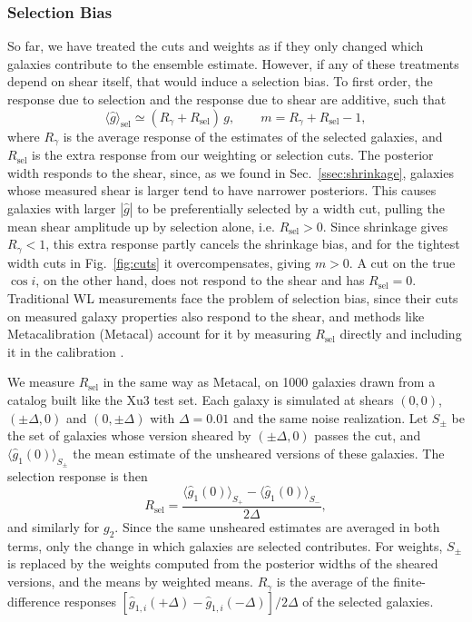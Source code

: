 \subsubsection{Selection Bias}
\label{sssec:selection}

So far, we have treated the cuts and weights as if they only changed which galaxies contribute to the ensemble estimate. However, if any of these treatments depend on shear itself, that would induce a selection bias. To first order, the response due to selection and the response due to shear are additive, such that
\begin{equation}
\label{eqn:selection-response}
    \langle\hat{g}\rangle_\mathrm{sel} \simeq (R_\gamma + R_\mathrm{sel})\, g, \qquad m = R_\gamma + R_\mathrm{sel} - 1,
\end{equation}
where $R_\gamma$ is the average response of the estimates of the selected galaxies, and $R_\mathrm{sel}$ is the extra response from our weighting or selection cuts. The posterior width responds to the shear, since, as we found in Sec.~\ref{ssec:shrinkage}, galaxies whose measured shear is larger tend to have narrower posteriors. This causes galaxies with larger $|\hat{g}|$ to be preferentially selected by a width cut, pulling the mean shear amplitude up by selection alone, i.e. $R_\mathrm{sel} > 0$. Since shrinkage gives $R_\gamma < 1$, this extra response partly cancels the shrinkage bias, and for the tightest width cuts in Fig.~\ref{fig:cuts} it overcompensates, giving $m > 0$. A cut on the true $\cos i$, on the other hand, does not respond to the shear and has $R_\mathrm{sel} = 0$. Traditional WL measurements face the problem of selection bias, since their cuts on measured galaxy properties also respond to the shear, and methods like Metacalibration (Metacal) account for it by measuring $R_\mathrm{sel}$ directly and including it in the calibration \citep{MetacalPractical, Metadet}.

We measure $R_\mathrm{sel}$ in the same way as Metacal, on 1000 galaxies drawn from a catalog built like the Xu3 test set. Each galaxy is simulated at shears $(0,0)$, $(\pm\Delta, 0)$ and $(0, \pm\Delta)$ with $\Delta = 0.01$ and the same noise realization. Let $S_\pm$ be the set of galaxies whose version sheared by $(\pm\Delta, 0)$ passes the cut, and $\langle \hat{g}_1(0) \rangle_{S_\pm}$ the mean estimate of the unsheared versions of these galaxies. The selection response is then
\begin{equation}
\label{eqn:rsel}
    R_\mathrm{sel} = \frac{\langle \hat{g}_1(0) \rangle_{S_+} - \langle \hat{g}_1(0) \rangle_{S_-}}{2\Delta},
\end{equation}
and similarly for $g_2$. Since the same unsheared estimates are averaged in both terms, only the change in which galaxies are selected contributes. For weights, $S_\pm$ is replaced by the weights computed from the posterior widths of the sheared versions, and the means by weighted means. $R_\gamma$ is the average of the finite-difference responses $[\hat{g}_{1,i}(+\Delta) - \hat{g}_{1,i}(-\Delta)]/2\Delta$ of the selected galaxies.

